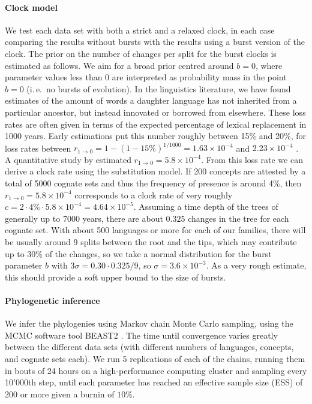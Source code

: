 \documentclass[]{rsos}%
\begin{document}
\paragraph{Clock model}
We test each data set with both a strict and a relaxed clock, in each case
comparing the results without bursts with the results
using a burst version of the clock. The prior on the number of changes per split for the 
burst clocks is estimated as follows. We aim for a broad prior centred around $b=0$,
where parameter values less than 0 are interpreted as probability mass in the point $b=0$ (i.\,e.\ no  bursts of evolution).
In the linguistics literature, we have found estimates of the amount of words a daughter language has not inherited from a particular ancestor, but instead innovated or borrowed from elsewhere. These loss rates are often
given in terms of the expected percentage of lexical
replacement in 1000 years. Early estimations
put this number roughly between 15\% and 20\%,
for loss rates between
$ r_{1 \rightarrow 0} = 1-(1 - 15\%)^{1/1000} = 1.63 × 10^{-4}$ and $2.23 × 10^{-4}$ \parencite{swadesh1955greater}.
A quantitative study by \textcite[p. 405]{pagel2000history} estimated $r_{1 \rightarrow 0} = 5.8 × 10^{-4}$.
From this loss rate we can derive a clock rate using the substitution model.
If 200 concepts are attested by a total of 5000 cognate sets and thus the frequency of presence is around 4\%, then $r_{1 \rightarrow 0} = 5.8 × 10^{-4}$
corresponds to a clock rate of very roughly $c = 2 \cdot 4\% \cdot 5.8 × 10^{-4}=4.64\times 10^{-5}$.
Assuming a time depth of the trees of generally up to 7000 years,
there are about $0.325$ changes in the tree for each cognate set. With about 500 languages or more for each of our 
families, there will be usually around 9 splits between the root and the
tips, which may contribute up to 30\% \parencite{atkinson2008languages} of the changes, so we take a
normal distribution for the burst parameter $b$ with $3\sigma = 0.30 \cdot 0.325 / 9$, so $\sigma=3.6 \times 10^{-3}$.
As a very rough estimate, this should provide a soft upper bound to the size of bursts.

\paragraph{Phylogenetic inference}
We infer the phylogenies using Markov chain Monte Carlo sampling, using the MCMC
software tool BEAST2 \parencite{drummond2015bayesian}. The time until convergence varies greatly
between the different data sets (with different numbers of languages, concepts, and
cognate sets each).
We run 5 replications of each of the chains, running them in bouts of 24 hours on a high-performance
computing cluster and sampling every 10'000th step, until each parameter has reached an effective sample size (ESS) of 
200 or more given a burnin of $10\%$.
\end{document}
